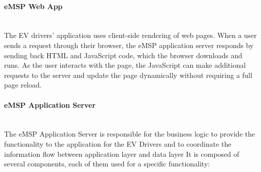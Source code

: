 \paragraph*{eMSP Web App} \hfill \\
The EV drivers' application uses client-side rendering of web pages. When a user sends a request through their browser, the eMSP application server responds by sending back HTML and JavaScript code, which the browser downloads and runs. As the user interacts with the page, the JavaScript can make additional requests to the server and update the page dynamically without requiring a full page reload.

\paragraph*{eMSP Application Server} \hfill \\
The eMSP Application Server is responsible for the business logic to provide the functionality to the application for the EV Drivers and to coordinate the information flow between application layer and data layer
It is composed of several components, each of them used for a specific functionality:\\
